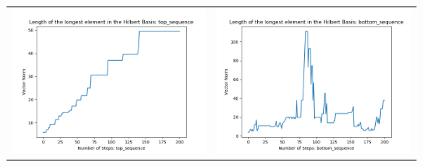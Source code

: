 \documentclass[10pt]{article}
\begin{document}
\begin{tabular}{c|c}
\begin{minipage}{.45\textwidth}
\includegraphics[width=\textwidth]{"DATA/5d/5 generators 2 bound E/top_sequence LENGTH"}
\end{minipage} &
\begin{minipage}{.45\textwidth}
\includegraphics[width=\textwidth]{"DATA/5d/5 generators 2 bound E bottomup/bottom_sequence LENGTH"}
\end{minipage}
\end{tabular}
\end{document}
